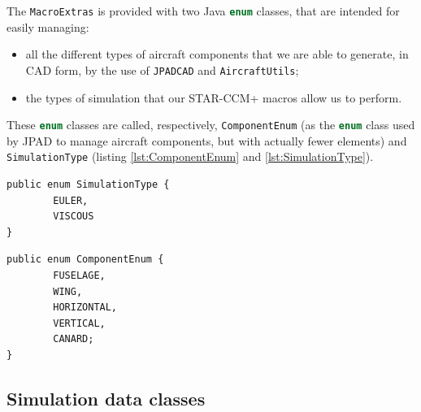 The \lstinline[language=Java]!MacroExtras! is provided with two Java \lstinline[language=Java]!enum! classes, that are intended for easily managing:
%
\begin{itemize}
\item all the different types of aircraft components that we are able to generate, in \gls{CAD} form, by the use of \lstinline[language=Java]!JPADCAD! and \lstinline[language=Java]!AircraftUtils!;
\item the types of simulation that our STAR-CCM+ macros allow us to perform.
\end{itemize}
%
These \lstinline[language=Java]!enum! classes are called, respectively, \lstinline[language=Java]!ComponentEnum! (as the \lstinline[language=Java]!enum! class used by \gls{JPAD} to manage aircraft components, but with actually fewer elements) and \lstinline[language=Java]!SimulationType! (listing \ref{lst:ComponentEnum} and \ref{lst:SimulationType}).
%
\bigskip
\begin{lstlisting}[caption={\lstinline!SimulationType! enumeration class}, captionpos=b, tabsize=2, label={lst:SimulationType}]	
public enum SimulationType {
		EULER,
		VISCOUS
}
\end{lstlisting}
%
\bigskip
\begin{lstlisting}[caption={\lstinline!ComponentEnum! enumeration class}, captionpos=b, tabsize=2, label={lst:ComponentEnum}]	
public enum ComponentEnum {
		FUSELAGE,
		WING,
		HORIZONTAL,
		VERTICAL,
		CANARD;
}
\end{lstlisting}
%

\subsection{Simulation data classes}
\label{sec4.3.2}

